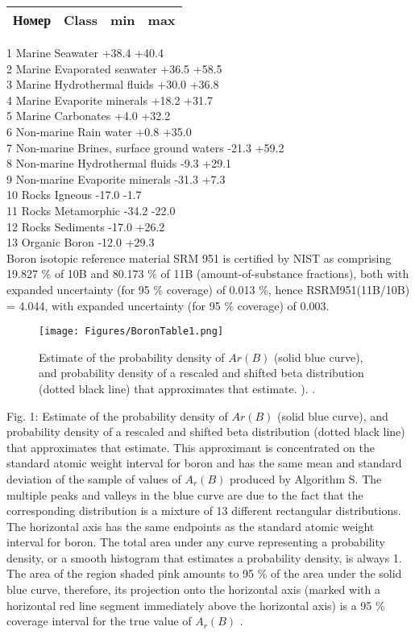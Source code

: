 \documentclass[a5paper,openany]{book}
\begin{document}
\begin{tabular}{cccc}
Номер & Class &
min & max \\
\hline
\end{tabular}
1 Marine Seawater +38.4 +40.4 \\
2 Marine Evaporated seawater +36.5 +58.5\\
3 Marine Hydrothermal fluids +30.0 +36.8\\
4 Marine Evaporite minerals +18.2 +31.7\\
5 Marine Carbonates +4.0 +32.2\\
6 Non-marine Rain water +0.8 +35.0\\
7 Non-marine Brines, surface ground waters -21.3 +59.2\\
8 Non-marine Hydrothermal fluids -9.3 +29.1\\
9 Non-marine Evaporite minerals -31.3 +7.3\\
10 Rocks Igneous -17.0 -1.7\\
11 Rocks Metamorphic -34.2 -22.0\\
12 Rocks Sediments -17.0 +26.2\\
13 Organic Boron -12.0 +29.3\\

Boron isotopic reference material SRM 951 is certified by NIST as comprising 19.827 \% of 10B and 80.173 \% of 11B (amount-of-substance
fractions), both with expanded uncertainty (for 95 \% coverage) of 0.013 \%, hence RSRM951(11B/10B) = 4.044, with expanded
uncertainty (for 95 \% coverage) of 0.003.

\begin{figure}[ht] 
	\centering\small
	\unitlength=1mm
	{\texttt{[image: Figures/BoronTable1.png]}} 
	\caption {Estimate of the probability density of $Ar(B)$ (solid blue curve), and probability density of a rescaled and shifted beta distribution 	(dotted black line) that approximates that estimate. ). \cite{IUPACUncertainty}.} 
\label{f:BoronTable1}
\end{figure}

Fig. 1: Estimate of the probability density of $Ar(B)$ (solid blue curve), and probability density of a rescaled and shifted beta distribution
(dotted black line) that approximates that estimate. This approximant is concentrated on the standard atomic weight interval for boron
and has the same mean and standard deviation of the sample of values of $A_r(B)$ produced by Algorithm S. The multiple peaks and
valleys in the blue curve are due to the fact that the corresponding distribution is a mixture of 13 different rectangular distributions.
The horizontal axis has the same endpoints as the standard atomic weight interval for boron. The total area under any curve representing
a probability density, or a smooth histogram that estimates a probability density, is always 1. The area of the region shaded pink
amounts to 95 \% of the area under the solid blue curve, therefore, its projection onto the horizontal axis (marked with a horizontal red
line segment immediately above the horizontal axis) is a 95 \% coverage interval for the true value of $A_r(B)$ .
\end{document}
